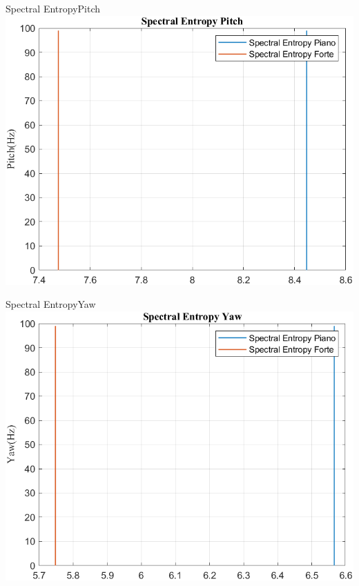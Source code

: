 	\begin{frame}{{Spectral EntropyPitch}}
		\centering\includegraphics[height=.8\textheight]{figure/VAng/Trasformata/Spectral EntropyPitch}
	\end{frame}
	
	\begin{frame}{{Spectral EntropyYaw}}
		\centering\includegraphics[height=.8\textheight]{figure/VAng/Trasformata/Spectral EntropyYaw}
	\end{frame}
	
